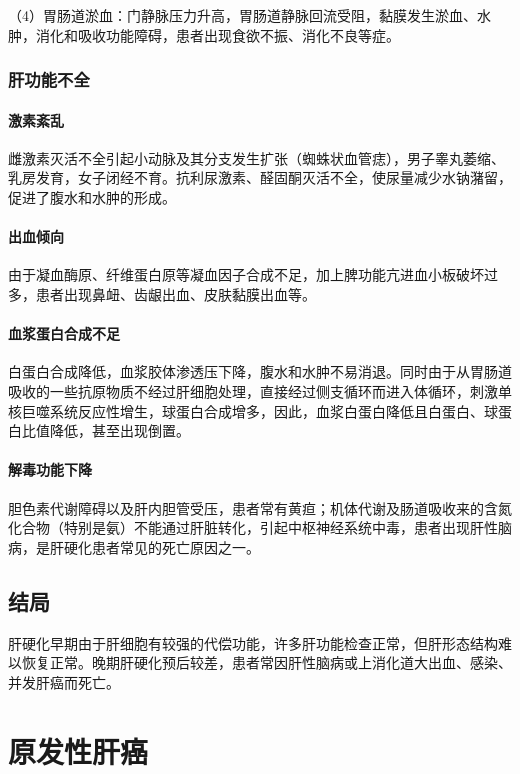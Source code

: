（4）胃肠道淤血：门静脉压力升高，胃肠道静脉回流受阻，黏膜发生淤血、水肿，消化和吸收功能障碍，患者出现食欲不振、消化不良等症。

{ \subsubsection{肝功能不全} }

\paragraph{激素紊乱}
雌激素灭活不全引起小动脉及其分支发生扩张（蜘蛛状血管痣），男子睾丸萎缩、乳房发育，女子闭经不育。抗利尿激素、醛固酮灭活不全，使尿量减少水钠潴留，促进了腹水和水肿的形成。

\paragraph{出血倾向}
由于凝血酶原、纤维蛋白原等凝血因子合成不足，加上脾功能亢进血小板破坏过多，患者出现鼻衄、齿龈出血、皮肤黏膜出血等。

\paragraph{血浆蛋白合成不足}
白蛋白合成降低，血浆胶体渗透压下降，腹水和水肿不易消退。同时由于从胃肠道吸收的一些抗原物质不经过肝细胞处理，直接经过侧支循环而进入体循环，刺激单核巨噬系统反应性增生，球蛋白合成增多，因此，血浆白蛋白降低且白蛋白、球蛋白比值降低，甚至出现倒置。

\paragraph{解毒功能下降}
胆色素代谢障碍以及肝内胆管受压，患者常有黄疸；机体代谢及肠道吸收来的含氮化合物（特别是氨）不能通过肝脏转化，引起中枢神经系统中毒，患者出现肝性脑病，是肝硬化患者常见的死亡原因之一。

\subsection{结局}

肝硬化早期由于肝细胞有较强的代偿功能，许多肝功能检查正常，但肝形态结构难以恢复正常。晚期肝硬化预后较差，患者常因肝性脑病或上消化道大出血、感染、并发肝癌而死亡。

\section{原发性肝癌}

